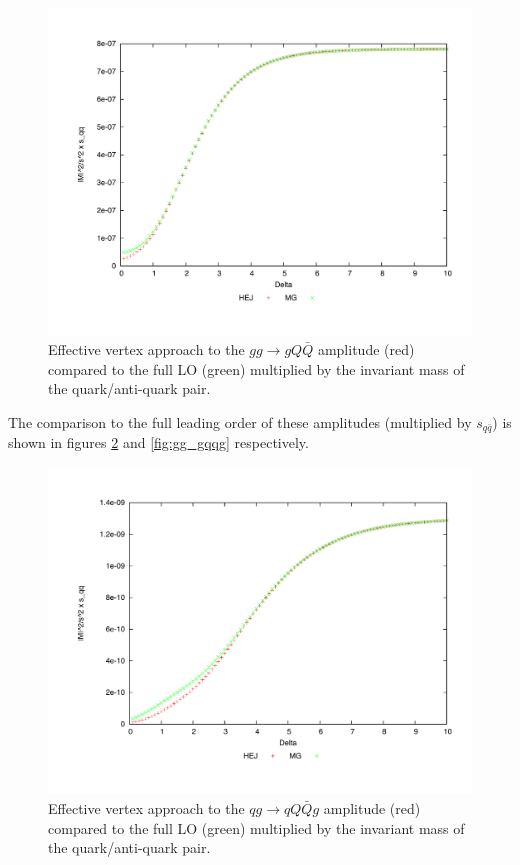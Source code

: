 \begin{figure}[t]
\centering
\includegraphics[scale=0.45]{Images/gg_gQQx_sqqx_simplecf.pdf}
\caption{Effective vertex approach to the $gg \to gQ\bar{Q}$ amplitude (red) compared to the full LO (green) multiplied by the invariant mass of the quark/anti-quark pair.}
\label{fig:gg_qqq}
\end{figure}

The comparison to the full leading order of these amplitudes (multiplied by $s_{q\bar{q}}$) is shown in figures \ref{fig:qg_qqqg} and \ref{fig:gg_gqqg} respectively. 

\begin{figure}[H]
\centering
\includegraphics[scale=0.47]{Images/qg_qqqxg_sqq_simplecf.pdf}
\caption{Effective vertex approach to the $qg \to qQ\bar{Q}g$ amplitude (red) compared to the full LO (green) multiplied by the invariant mass of the quark/anti-quark pair.}
\label{fig:qg_qqqg}
\end{figure}

